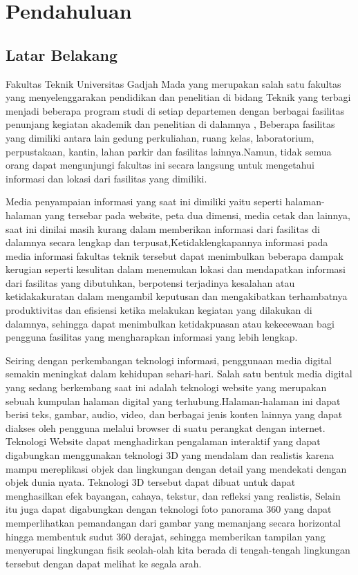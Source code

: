 \chapter{Pendahuluan}

\section{Latar Belakang}



Fakultas Teknik Universitas Gadjah Mada yang merupakan salah satu fakultas yang menyelenggarakan pendidikan 
dan penelitian di bidang Teknik yang terbagi menjadi beberapa program studi di setiap departemen dengan
berbagai fasilitas penunjang kegiatan akademik dan penelitian di dalamnya \cite{whatisftugm}, Beberapa fasilitas yang
dimiliki antara lain gedung perkuliahan, ruang kelas, laboratorium, perpustakaan, kantin, lahan parkir
dan fasilitas lainnya.Namun, tidak semua orang dapat mengunjungi fakultas ini secara langsung untuk
mengetahui informasi dan lokasi dari fasilitas yang dimiliki.

Media penyampaian informasi yang saat ini dimiliki yaitu seperti halaman-halaman yang tersebar pada website, 
peta dua dimensi, media cetak dan lainnya, saat ini dinilai masih kurang dalam memberikan
informasi dari fasilitas di dalamnya secara lengkap dan terpusat,Ketidaklengkapannya informasi pada 
media informasi fakultas teknik tersebut dapat menimbulkan beberapa dampak kerugian seperti kesulitan dalam menemukan
lokasi dan mendapatkan informasi dari fasilitas yang dibutuhkan, berpotensi terjadinya kesalahan atau 
ketidakakuratan dalam mengambil keputusan dan mengakibatkan terhambatnya produktivitas dan efisiensi 
ketika melakukan kegiatan yang dilakukan di dalamnya, sehingga dapat menimbulkan ketidakpuasan
atau kekecewaan bagi pengguna fasilitas yang mengharapkan informasi yang lebih lengkap.  

Seiring dengan perkembangan teknologi informasi, penggunaan media digital semakin meningkat
dalam kehidupan sehari-hari. Salah satu bentuk media digital yang sedang berkembang saat ini
adalah teknologi website yang merupakan sebuah kumpulan halaman digital yang terhubung.Halaman-halaman
ini dapat berisi teks, gambar, audio, video, dan berbagai jenis konten lainnya yang dapat diakses 
oleh pengguna melalui browser di suatu perangkat dengan internet\cite{whatiswebsite}. Teknologi Website dapat menghadirkan 
pengalaman interaktif yang dapat digabungkan menggunakan teknologi 3D yang mendalam dan 
realistis karena mampu mereplikasi
objek dan lingkungan dengan detail yang mendekati dengan objek dunia nyata\cite{whatis3dobject}. 
Teknologi 3D tersebut dapat dibuat untuk dapat menghasilkan efek bayangan, cahaya, tekstur, dan refleksi yang realistis,
Selain itu juga dapat digabungkan dengan teknologi foto panorama 360 yang dapat 
memperlihatkan pemandangan dari gambar yang memanjang secara horizontal hingga membentuk
sudut 360 derajat, sehingga memberikan tampilan yang menyerupai lingkungan fisik seolah-olah 
kita berada di tengah-tengah lingkungan tersebut dengan dapat melihat ke segala arah.


